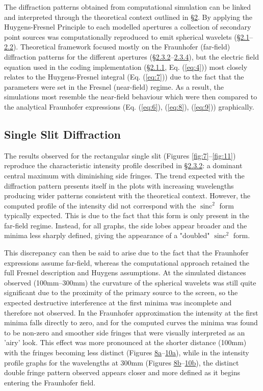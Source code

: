 \documentclass[12pt]{article}
\DeclareMathOperator{\sinc}{sinc}
\begin{document}
The diffraction patterns obtained from computational simulation can be linked and interpreted through the theoretical context outlined in \hyperref[sec:2]{§2}. By applying the Huygens-Fresnel Principle to each
modelled apertures a collection of secondary point sources was computationally reproduced to emit spherical wavelets (\hyperref[sec:2.1]{§2.1}–\hyperref[sec:2.2]{2.2}).
Theoretical framework focused mostly on the Fraunhofer (far-field) diffraction patterns for the different apertures (\hyperref[sec:2.3.2]{§2.3.2}–\hyperref[sec:2.3.4]{2.3.4}), but the electric field equation used in the coding
implementation (\hyperref[sec:2.1.1]{§2.1.1}, Eq. (\ref{eq:4})) most closely relates to the Huygens-Fresnel integral (Eq. (\ref{eq:7})) due to the fact that the parameters were set in the Fresnel (near-field) regime.
As a result, the simulations most resemble the near-field behaviour which were then compared to the analytical Fraunhofer expressions (Eq. (\ref{eq:6}), (\ref{eq:8}), (\ref{eq:9})) graphically.

\subsection{Single Slit Diffraction}

The results observed for the rectangular single slit (Figures \ref{fig:7}–\ref{fig:11}) reproduce the characteristic intensity profile described in \hyperref[sec:2.3.2]{§2.3.2}: a dominant central maximum with diminishing side fringes.
The trend expected with the diffraction pattern presents itself in the plots with increasing wavelengths producing wider patterns consistent with the theoretical context. However, the computed profile of the intensity did not 
correspond with the \( \sinc^2 \) form typically expected. This is due to the fact that this form is only present in the far-field regime. Instead, for all graphs, the side lobes appear broader and the minima less sharply defined, giving the appearance of a "doubled" \( \sinc^2 \) form.

This discrepancy can then be said to arise due to the fact that the Fraunhofer expressions assume far-field, whereas the computational approach retained the full Fresnel description and Huygens assumptions.
At the simulated distances observed (100mm–300mm) the curvature of the spherical wavelets was still quite significant due to the proximity of the primary source to the screen, so the expected destructive interference at the first minima
was incomplete and therefore not observed. In the Fraunhofer approximation the intensity at the first minima falls directly to zero, and for the computed curves the minima was found to be non-zero and smoother side fringes that were visually interpreted
as an 'airy' look. This effect was more pronounced at the shorter distance (100mm) with the fringes becoming less distinct (Figures \hyperref[fig:8a]{8a}–\hyperref[fig:10a]{10a}), while in the intensity profile graphs for the wavelengths at 300mm (Figures \hyperref[fig:8b]{8b}–\hyperref[fig:10b]{10b}),
the distinct double fringe pattern observed appears closer and more defined as it begins entering the Fraunhofer field.
\end{document}

